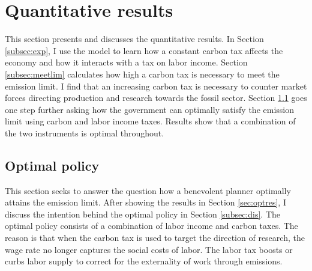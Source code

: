 \section{Quantitative results}\label{sec:res}

This section presents and discusses the quantitative results. 
In Section \ref{subsec:exp}, I use the model to learn how a constant carbon tax affects the economy and how it interacts with a tax on labor income. Section \ref{subsec:meetlim} calculates how high a carbon tax is necessary to meet the emission limit. I find that an increasing carbon tax is necessary to counter market forces directing production and research towards the fossil sector. 
Section \ref{subsec:mr} goes one step further asking  how the government can optimally satisfy the emission limit using carbon and labor income taxes. Results show that a combination of the two instruments is optimal throughout. 




\subsection{Optimal policy}\label{subsec:mr}


This section seeks to answer the question how a benevolent planner optimally attains the emission limit. After showing the results in Section \ref{sec:optres}, I discuss the intention behind the optimal policy in Section \ref{subsec:dis}. The optimal policy consists of a combination of labor income and carbon taxes. The reason is that when the carbon tax is used to target the direction of research, the wage rate no longer captures the social costs of labor. The labor tax boosts or curbs labor supply to correct for the externality of work through emissions. 

